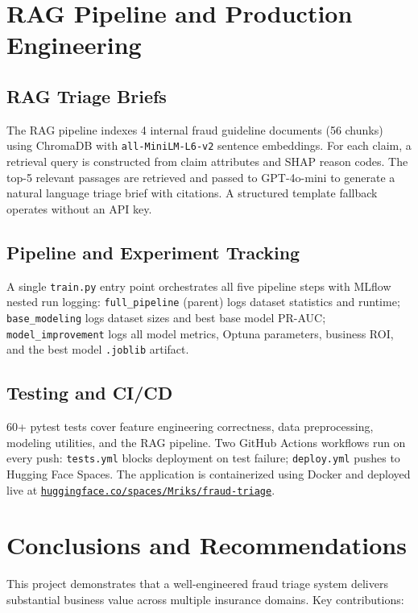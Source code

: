 \documentclass[10pt,twocolumn]{article}
\begin{document}
\section{RAG Pipeline and Production Engineering}

\subsection{RAG Triage Briefs}
The RAG pipeline indexes 4 internal fraud guideline documents (56 chunks) using ChromaDB \cite{chromadb} with \texttt{all-MiniLM-L6-v2} sentence embeddings. For each claim, a retrieval query is constructed from claim attributes and SHAP reason codes. The top-5 relevant passages are retrieved and passed to GPT-4o-mini \cite{openai} to generate a natural language triage brief with citations. A structured template fallback operates without an API key.

\subsection{Pipeline and Experiment Tracking}
A single \texttt{train.py} entry point orchestrates all five pipeline steps with MLflow nested run logging: \texttt{full\_pipeline} (parent) logs dataset statistics and runtime; \texttt{base\_modeling} logs dataset sizes and best base model PR-AUC; \texttt{model\_improvement} logs all model metrics, Optuna parameters, business ROI, and the best model \texttt{.joblib} artifact.

\subsection{Testing and CI/CD}
60+ pytest tests cover feature engineering correctness, data preprocessing, modeling utilities, and the RAG pipeline. Two GitHub Actions workflows run on every push: \texttt{tests.yml} blocks deployment on test failure; \texttt{deploy.yml} pushes to Hugging Face Spaces. The application is containerized using Docker and deployed live at \href{https://huggingface.co/spaces/Mriks/fraud-triage}{\texttt{huggingface.co/spaces/Mriks/fraud-triage}}.

\section{Conclusions and Recommendations}

This project demonstrates that a well-engineered fraud triage system delivers substantial business value across multiple insurance domains. Key contributions:
\end{document}
